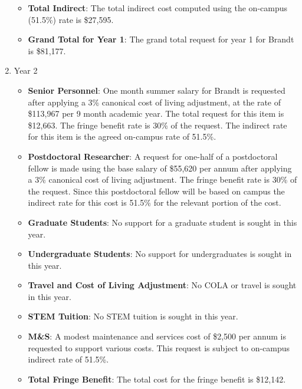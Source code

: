 \begin{enumerate}
\begin{itemize}[noitemsep,nolistsep]
\item {{\bf Total Indirect}: The total indirect cost computed using the on-campus (51.5\%) rate is \$27,595.}

\item {{\bf Grand Total for Year 1}: The grand total request for year 1 for Brandt is \$81,177.}

\end{itemize}

\item{Year 2}
\begin{itemize}[noitemsep,nolistsep]
\item{{\bf Senior Personnel}: One month summer salary for Brandt is requested after applying a 3\% canonical cost of living adjustment, at the rate of \$113,967 per 9 month academic year.  The total request for this item is \$12,663.   The fringe benefit rate is 30\% of the request.  The indirect rate for this item is the agreed on-campus rate of 51.5\%.}

\item {{\bf Postdoctoral Researcher}: A request for one-half of a postdoctoral fellow is made using the base salary of \$55,620 per annum after applying a 3\% canonical cost of living adjustment.  The fringe benefit rate is 30\% of the request.  Since this postdoctoral fellow will be based on campus the indirect rate for this cost is 51.5\% for the relevant portion of the cost.} 

\item{{\bf Graduate Students}: No support for a graduate student is sought in this year. }

\item {{\bf Undergraduate Students}: No support for undergraduates is sought in this year.}

\item{{\bf Travel and Cost of Living Adjustment}: No COLA or travel is sought in this year.}

\item {{\bf STEM Tuition}: No STEM tuition is sought in this year.}

\item {{\bf M\&S}: A modest maintenance and services cost of \$2,500 per annum is requested to support various costs.   This request is subject to on-campus indirect rate of 51.5\%.}

\item {{\bf Total Fringe Benefit}: The total cost for the fringe benefit is \$12,142.}


\end{itemize}
\end{enumerate}
